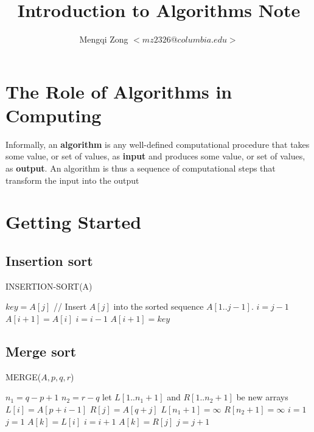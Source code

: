 \documentclass[12pt]{article}
\title{Introduction to Algorithms Note}
\author{Mengqi Zong $<mz2326@columbia.edu>$}
\begin{document}
\maketitle

\setlength{\parindent}{0in}

\section{The Role of Algorithms in Computing}

Informally, an \textbf {algorithm} is any well-defined computational procedure that takes some value, or set of values, as \textbf {input} and produces some value, or set of values, as \textbf {output}. An algorithm is thus a sequence of computational steps that transform the input into the output

\section{Getting Started}

\subsection{Insertion sort}

INSERTION-SORT(A)
\begin{algorithmic}[1]
	\State $key = A[j]$
        \State // Insert $A[j]$ into the sorted sequence $A[1..j-1]$.
        \State $i = j - 1$
        	\State $A[i+1] = A[i]$
                \State $i = i - 1$
        \EndWhile
        \State $A[i+1] = key$
\EndFor
\end{algorithmic}

\subsection{Merge sort}

MERGE($A, p, q, r$)
\begin{algorithmic}[1]
\State $n_1 = q - p + 1$
\State $n_2 = r - q$
\State let $L[1..n_1+1]$ and $R[1..n_2+1]$ be new arrays
	\State $L[i] = A[p+i-1]$
\EndFor
{}
	\State $R[j] = A[q+j]$
\EndFor
\State $L[n_1 + 1] = \infty$
\State $R[n_2 + 1] = \infty$
\State $i = 1$
\State $j = 1$
        	\State $A[k] = L[i]$
                \State $i = i + 1$
        \Else
        	\State $A[k] = R[j]$
        	\State $j = j + 1$
        \EndIf
\EndFor
\end{algorithmic}
\end{document}

